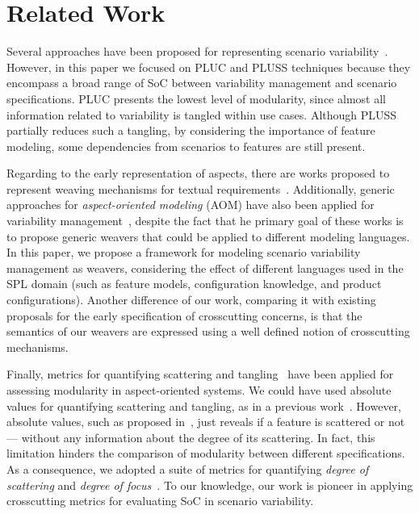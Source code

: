\section{Related Work}
\label{sec:related}

Several approaches have been proposed for representing
scenario variability~\cite{Jacobson:1997aa,Griss:1998aa, Eriksson:2005aa,Bertolino:2003aa}. However, in this paper
we focused on PLUC and
PLUSS techniques because they encompass a broad range
of SoC between variability management and scenario specifications.
PLUC presents the lowest level of modularity, since
almost all information related to variability is tangled within
use cases. Although PLUSS partially reduces such a tangling,
by considering the importance of feature modeling, some
dependencies from scenarios to features are still present.

Regarding to the early representation of aspects, there are works proposed to
represent weaving mechanisms for textual
requirements~\cite{Chitchyan:2007aa,Sillito:2004aa}.  Additionally, generic 
approaches for \emph{aspect-oriented modeling} (AOM) have also been applied for 
variability management~\cite{Morin:2008aa,Groher:2008aa}, despite the fact that he primary goal of these 
works is to propose generic weavers that could be applied to different modeling languages. In this paper, 
we propose a framework for modeling scenario variability management as weavers, 
considering the effect of different languages used in the SPL domain (such as
feature models, configuration knowledge, and product configurations). 
Another difference of our work, comparing it with existing proposals for the
early specification of crosscutting concerns, is that the semantics of our
weavers are expressed using a well defined notion of crosscutting mechanisms.

Finally, metrics for quantifying scattering and tangling~\cite{Eaddy:2007aa,Figueiredo:2008aa} have been applied for assessing modularity in aspect-oriented
systems. We could have used absolute values for quantifying scattering and tangling, as
 in a previous work~\cite{Bonifacio:2008aa}. However, absolute values, such as proposed in~\cite{Figueiredo:2008aa}, just reveals if a feature is scattered or not--- without any information about the degree of its scattering. In fact, this limitation hinders the comparison of modularity between different specifications.
As a consequence, we adopted a suite of metrics for quantifying
\emph{degree of scattering} and \emph{degree of focus}~\cite{Eaddy:2007aa}.
To our knowledge, our work is pioneer in applying crosscutting metrics for evaluating SoC in scenario variability.


